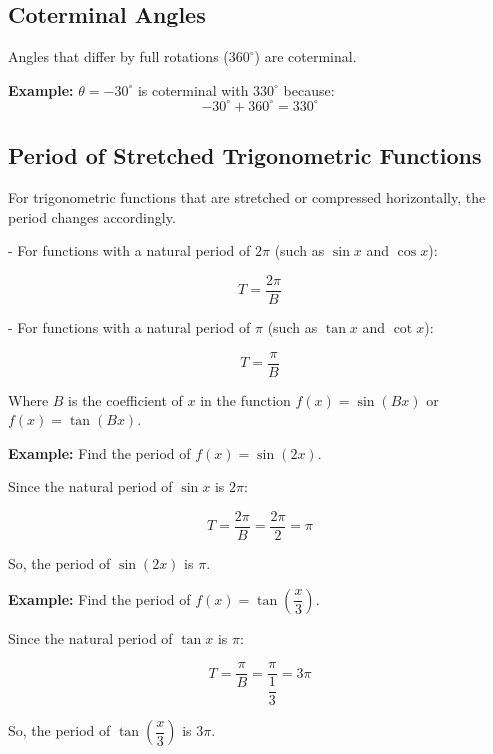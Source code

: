 \documentclass{article}
\begin{document}
\begin{multicols}{2}
\subsection*{Coterminal Angles}
Angles that differ by full rotations (\(360^\circ\)) are coterminal.

\textbf{Example:} \( \theta = -30^\circ \) is coterminal with \( 330^\circ \) because:
\[
-30^\circ + 360^\circ = 330^\circ
\]

\subsection*{Period of Stretched Trigonometric Functions}

For trigonometric functions that are stretched or compressed horizontally, the period changes accordingly.

- For functions with a natural period of \( 2\pi \) (such as \( \sin x \) and \( \cos x \)):

\[
T = \dfrac{2\pi}{B}
\]

- For functions with a natural period of \( \pi \) (such as \( \tan x \) and \( \cot x \)):

\[
T = \dfrac{\pi}{B}
\]

Where \( B \) is the coefficient of \( x \) in the function \( f(x) = \sin(Bx) \) or \( f(x) = \tan(Bx) \).

\textbf{Example:} Find the period of \( f(x) = \sin(2x) \).

Since the natural period of \( \sin x \) is \( 2\pi \):

\[
T = \dfrac{2\pi}{B} = \dfrac{2\pi}{2} = \pi
\]

So, the period of \( \sin(2x) \) is \( \pi \).

\textbf{Example:} Find the period of \( f(x) = \tan\left( \dfrac{x}{3} \right) \).

Since the natural period of \( \tan x \) is \( \pi \):

\[
T = \dfrac{\pi}{B} = \dfrac{\pi}{\dfrac{1}{3}} = 3\pi
\]

So, the period of \( \tan\left( \dfrac{x}{3} \right) \) is \( 3\pi \).

\end{multicols}
\end{document}
